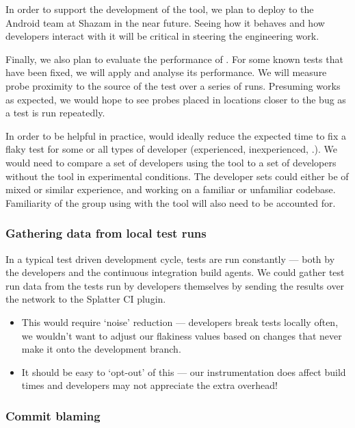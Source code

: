 In order to support the development of the tool, we plan to deploy \splatter{} to the Android team at Shazam in the near future. Seeing how it behaves and how developers interact with it will be critical in steering the engineering work.

Finally, we also plan to evaluate the performance of \splatter{}. For some known \flaky{} tests that have been fixed, we will apply \splatter{} and analyse its performance. We will measure probe proximity to the source of the \flaky{} test over a series of runs. Presuming \splatter{} works as expected, we would hope to see probes placed in locations closer to the bug as a test is run repeatedly.

In order to be helpful in practice, \splatter{} would ideally reduce the expected time to fix a flaky test for some or all types of developer (experienced, inexperienced, \etc.). We would need to compare a set of developers using the tool to a set of developers without the tool in experimental conditions. The developer sets could either be of mixed or similar experience, and working on a familiar or unfamiliar codebase. Familiarity of the group using \splatter{} with the tool will also need to be accounted for.

\subsubsection{Gathering data from local test runs}

In a typical test driven development cycle, tests are run constantly --- both by the developers and the continuous integration build agents. We could gather test run data from the tests run by developers themselves by sending the results over the network to the Splatter CI plugin.

\begin{itemize}
	\item This would require {\lq}noise{\rq} reduction --- developers break tests locally often, we wouldn't want to adjust our flakiness values based on changes that never make it onto the development branch.
	\item It should be easy to {\lq}opt-out{\rq} of this --- our instrumentation does affect build times and developers may not appreciate the extra overhead!
\end{itemize}

\subsubsection{Commit blaming}

